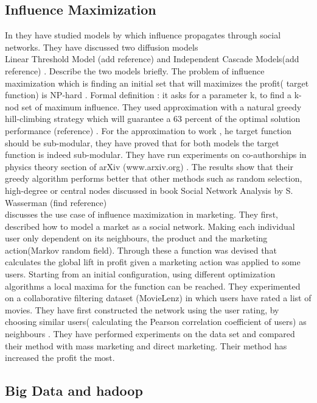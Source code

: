 \documentclass[english]{tktltiki}
\begin{document}
\subsection{Influence Maximization}
In \cite{kempe03} they have studied models by which influence propagates through social networks. They have discussed two diffusion models \\
Linear Threshold Model (add reference) and Independent Cascade Models(add reference) . Describe the two models briefly. 
The problem of influence maximization which is finding an initial set that will maximizes the profit( target function) is NP-hard . 
Formal definition : it asks for a parameter k, to find a k-nod set of maximum influence. They used approximation with a natural greedy hill-climbing strategy which will guarantee a 63 percent of the optimal solution performance (reference) . For the approximation to work , he target function should be sub-modular, they have proved that for both models the target function is indeed sub-modular.  They have run experiments on co-authorships in physics theory section of arXiv (www.arxiv.org) . The results show that their greedy algorithm performs better that other methods such as random selection, high-degree or central nodes discussed in book Social Network Analysis by S. Wasserman (find reference) \\
\cite{domingo01} discusses the use case of influence maximization in marketing. They first, described how to model a market as a social network. Making each individual user only dependent on its neighbours, the product and the marketing action(Markov random field). Through these a function was devised that calculates the global lift in profit given a marketing action was applied to some users. Starting from an initial configuration, using different optimization algorithms a local maxima for the function can be reached. 
They experimented on a collaborative filtering dataset (MovieLenz) in which users have rated a list of movies. They have first constructed the network using the user rating, by choosing similar users( calculating the Pearson correlation coefficient of users) as neighbours . They have performed experiments on the data set and compared their method with mass marketing and direct marketing. Their method has increased the profit the most. 







\subsection{Big Data and hadoop}
\end{document}

